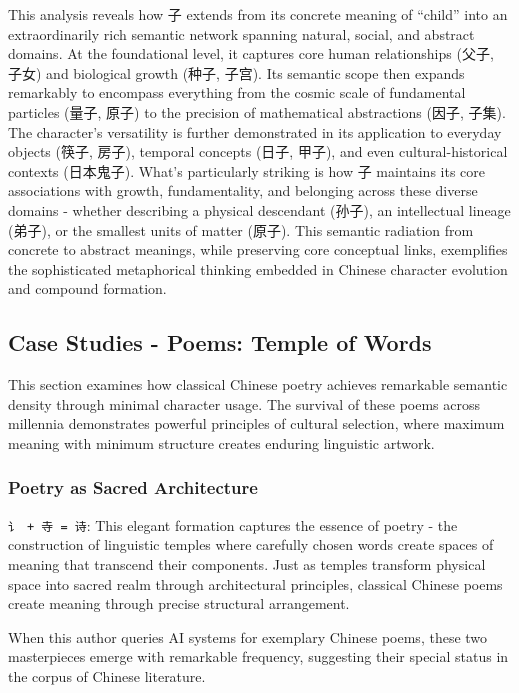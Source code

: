 \documentclass[11pt,letterpaper]{article}
\begin{document}
This analysis reveals how 子 extends from its concrete meaning of
``child'' into an extraordinarily rich semantic network spanning
natural, social, and abstract domains. At the foundational level, it
captures core human relationships (父子, 子女) and biological growth
(种子, 子宫). Its semantic scope then expands remarkably to encompass
everything from the cosmic scale of fundamental particles (量子, 原子)
to the precision of mathematical abstractions (因子, 子集). The
character's versatility is further demonstrated in its application to
everyday objects (筷子, 房子), temporal concepts (日子, 甲子), and even
cultural-historical contexts (日本鬼子). What's particularly striking is
how 子 maintains its core associations with growth, fundamentality, and
belonging across these diverse domains - whether describing a physical
descendant (孙子), an intellectual lineage (弟子), or the smallest units
of matter (原子). This semantic radiation from concrete to abstract
meanings, while preserving core conceptual links, exemplifies the
sophisticated metaphorical thinking embedded in Chinese character
evolution and compound formation.

\subsection{Case Studies - Poems: Temple of Words}\label{case-studies---poems-temple-of-words}

This section examines how classical Chinese poetry achieves remarkable
semantic density through minimal character usage. The survival of these
poems across millennia demonstrates powerful principles of cultural
selection, where maximum meaning with minimum structure creates enduring
linguistic artwork.

\subsubsection{Poetry as Sacred Architecture}\label{poetry-as-sacred-architecture}

\texttt{讠\ +\ 寺\ =\ 诗}: This elegant formation captures the essence
of poetry - the construction of linguistic temples where carefully
chosen words create spaces of meaning that transcend their components.
Just as temples transform physical space into sacred realm through
architectural principles, classical Chinese poems create meaning through
precise structural arrangement.

When this author queries AI systems for exemplary Chinese poems, these
two masterpieces emerge with remarkable frequency, suggesting their
special status in the corpus of Chinese literature.
\end{document}
